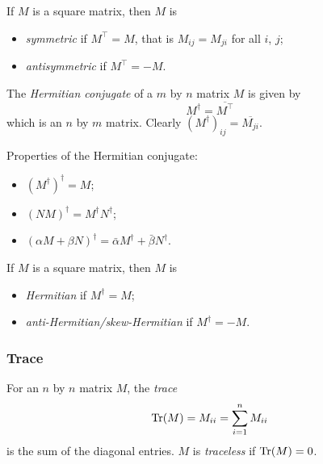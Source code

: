 \documentclass{../../template/note}
\begin{document}
    \begin{definition}
        If \(M\) is a square matrix, then \(M\) is
        \begin{itemize}
            \item \emph{symmetric} if \(M^\intercal = M\), that is \(M_{ij} = M_{ji}\) for all \(i\), \(j\);
            \item \emph{antisymmetric} if \(M^\intercal = -M\).
        \end{itemize}
    \end{definition}
    
    \begin{definition}
        The \emph{Hermitian conjugate} of a \(m\) by \(n\) matrix \(M\) is given by
        \[
            M^\dagger = \overline{M^\intercal}
        \]
        which is an \(n\) by \(m\) matrix. Clearly \((M^\dagger)_{ij} = \overline{M_{ji}}\).
    \end{definition}
    
    Properties of the Hermitian conjugate:

    \begin{itemize}
        \item \((M^\dagger)^\dagger = M\); 
        \item \((NM)^\dagger = M^\dagger N^\dagger\);
        \item \((\alpha M + \beta N)^\dagger = \bar\alpha M^\dagger + \bar\beta N^\dagger\).
    \end{itemize}
    
    \begin{definition}
        If \(M\) is a square matrix, then \(M\) is
        \begin{itemize}
            \item \emph{Hermitian} if \(M^\dagger = M\);
            \item \emph{anti-Hermitian/skew-Hermitian} if \(M^\dagger = -M\).
        \end{itemize}
    \end{definition}
    
    \subsubsection{Trace}

    \begin{definition}
        For an \(n\) by \(n\) matrix \(M\), the \emph{trace}
        \[
            \operatorname{Tr}(M) = M_{ii} = \sum_{i=1}^n M_{ii}
        \]
        is the sum of the diagonal entries. \(M\) is \emph{traceless} if \(\operatorname{Tr}(M) = 0\).
    \end{definition}
    
\end{document}
